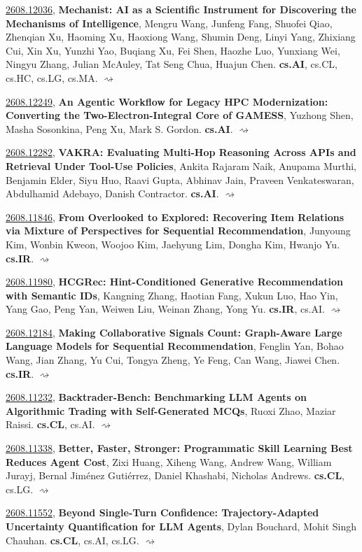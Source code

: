 \documentclass[9pt, a4paper]{article}
\theoremstyle{plain}
\theoremstyle{definition}
\theoremstyle{remark}
\newcommand{\arxiv}[3]{\href{https://arxiv.org/abs/#1}{#1}, \textbf{\textcolor{arxivblue}{#2}}, #3. }
\begin{document}
\arxiv{2608.12036}{Mechanist: AI as a Scientific Instrument for Discovering the Mechanisms of Intelligence}{Mengru Wang, Junfeng Fang, Shuofei Qiao, Zhenqian Xu, Haoming Xu, Haoxiong Wang, Shumin Deng, Linyi Yang, Zhixiang Cui, Xin Xu, Yunzhi Yao, Buqiang Xu, Fei Shen, Haozhe Luo, Yunxiang Wei, Ningyu Zhang, Julian McAuley, Tat Seng Chua, Huajun Chen}\textbf{cs.AI}, cs.CL, cs.HC, cs.LG, cs.MA. \hyperlink{2608.12036}{$\rightsquigarrow$}

\arxiv{2608.12249}{An Agentic Workflow for Legacy HPC Modernization: Converting the Two-Electron-Integral Core of GAMESS}{Yuzhong Shen, Masha Sosonkina, Peng Xu, Mark S. Gordon}\textbf{cs.AI}. \hyperlink{2608.12249}{$\rightsquigarrow$}

\arxiv{2608.12282}{VAKRA: Evaluating Multi-Hop Reasoning Across APIs and Retrieval Under Tool-Use Policies}{Ankita Rajaram Naik, Anupama Murthi, Benjamin Elder, Siyu Huo, Raavi Gupta, Abhinav Jain, Praveen Venkateswaran, Abdulhamid Adebayo, Danish Contractor}\textbf{cs.AI}. \hyperlink{2608.12282}{$\rightsquigarrow$}

\arxiv{2608.11846}{From Overlooked to Explored: Recovering Item Relations via Mixture of Perspectives for Sequential Recommendation}{Junyoung Kim, Wonbin Kweon, Woojoo Kim, Jaehyung Lim, Dongha Kim, Hwanjo Yu}\textbf{cs.IR}. \hyperlink{2608.11846}{$\rightsquigarrow$}

\arxiv{2608.11980}{HCGRec: Hint-Conditioned Generative Recommendation with Semantic IDs}{Kangning Zhang, Haotian Fang, Xukun Luo, Hao Yin, Yang Gao, Peng Yan, Weiwen Liu, Weinan Zhang, Yong Yu}\textbf{cs.IR}, cs.AI. \hyperlink{2608.11980}{$\rightsquigarrow$}

\arxiv{2608.12184}{Making Collaborative Signals Count: Graph-Aware Large Language Models for Sequential Recommendation}{Fenglin Yan, Bohao Wang, Jian Zhang, Yu Cui, Tongya Zheng, Ye Feng, Can Wang, Jiawei Chen}\textbf{cs.IR}. \hyperlink{2608.12184}{$\rightsquigarrow$}

\arxiv{2608.11232}{Backtrader-Bench: Benchmarking LLM Agents on Algorithmic Trading with Self-Generated MCQs}{Ruoxi Zhao, Maziar Raissi}\textbf{cs.CL}, cs.AI. \hyperlink{2608.11232}{$\rightsquigarrow$}

\arxiv{2608.11338}{Better, Faster, Stronger: Programmatic Skill Learning Best Reduces Agent Cost}{Zixi Huang, Xiheng Wang, Andrew Wang, William Jurayj, Bernal Jiménez Gutiérrez, Daniel Khashabi, Nicholas Andrews}\textbf{cs.CL}, cs.LG. \hyperlink{2608.11338}{$\rightsquigarrow$}

\arxiv{2608.11552}{Beyond Single-Turn Confidence: Trajectory-Adapted Uncertainty Quantification for LLM Agents}{Dylan Bouchard, Mohit Singh Chauhan}\textbf{cs.CL}, cs.AI, cs.LG. \hyperlink{2608.11552}{$\rightsquigarrow$}
\end{document}
